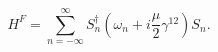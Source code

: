 \begin{equation}
H^F = \sum_{n=-\infty}^{\infty} S^\dagger_n (\omega_n + i \frac{\mu}{2} \gamma^{12}) S_n.
\end{equation}


